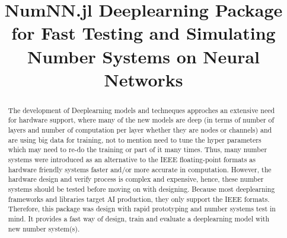 \documentclass[onecolumn,draftcls,12pt,conference]{IEEEtran}
\title{NumNN.jl Deeplearning Package for Fast Testing and Simulating Number Systems on Neural Networks}
\author{\IEEEauthorblockN{Mohammad~Hizzani} \IEEEauthorblockA{University of Lisbon\\
		Email: \href{mailto:moh.hizzani@gmail.com}{moh.hizzani@gmail.com}}
}
\begin{document}
	\maketitle

	\begin{abstract}
		The development of Deeplearning models and techneques approches an extensive need for hardware support, where many of the new models are deep (in terms of number of layers and number of computation per layer whether they are nodes or channels) and are using big data for training, not to mention need to tune the hyper parameters which may need to re-do the training or part of it many times. Thus, many number systems were introduced as an alternative to the IEEE floating-point formats as hardware friendly systems faster and/or more accurate in computation. However, the hardware design and verify process is complex and expensive, hence, these number systems should be tested before moving on with designing. Because most deeplearning frameworks and libraries target AI production, they only support the IEEE formats. Therefore, this package was design with rapid prototyping and number systems test in mind. It provides a fast way of design, train and evaluate a deeplearning model with new number system(s).
	\end{abstract}

	
	
	
%	
	
	
	
	
\end{document}
